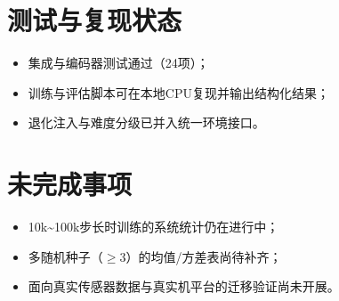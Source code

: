 \section{测试与复现状态}
\begin{itemize}
    \item 集成与编码器测试通过（24项）；
    \item 训练与评估脚本可在本地CPU复现并输出结构化结果；
    \item 退化注入与难度分级已并入统一环境接口。
\end{itemize}

\section{未完成事项}
\begin{itemize}
    \item 10k\textasciitilde100k步长时训练的系统统计仍在进行中；
    \item 多随机种子（$\ge3$）的均值/方差表尚待补齐；
    \item 面向真实传感器数据与真实机平台的迁移验证尚未开展。
\end{itemize}
